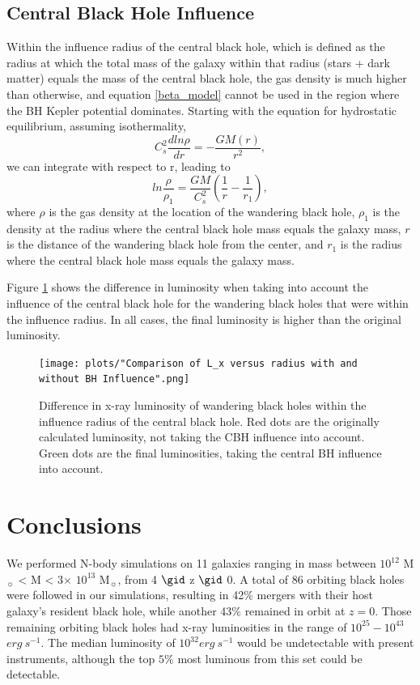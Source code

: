 \documentclass[fleqn,usenatbib,useAMS]{mnras}
\begin{document}
\subsection{Central Black Hole Influence}
Within the influence radius of the central black hole, which is defined as the radius at which the total mass of the galaxy within that radius (stars + dark matter) equals the mass of the central black hole, the gas density is much higher than otherwise, and equation \eqref{beta_model} cannot be used in the region where the BH Kepler potential dominates.  Starting with the equation for hydrostatic equilibrium, assuming isothermality,
\begin{equation}
    C_{s}^2\frac{dln\rho}{dr}= -\frac{GM(r)}{r^2},
\end{equation}
we can integrate with respect to r, leading to 
\begin{equation}
    ln\frac{\rho}{\rho_1} = \frac{GM}{C_{s}^2}\left(\frac{1}{r} - \frac{1}{r_1}\right),
\end{equation}
where $\rho$ is the gas density at the location of the wandering black hole, $\rho_1$ is the density at the radius where the central black hole mass equals the galaxy mass, $r$ is the distance of the wandering black hole from the center, and $r_1$ is the radius where the central black hole mass equals the galaxy mass.

Figure \ref{fig:wui} shows the difference in luminosity when taking into account the influence of the central black hole for the wandering black holes that were within the influence radius.  In all cases, the final luminosity is higher than the original luminosity.
\begin{figure}
\begin{center}
\texttt{[image: plots/"Comparison of L\_x versus radius with and without BH Influence".png]}
\caption{Difference in x-ray luminosity of wandering black holes within the influence radius of the central black hole.  Red dots are the originally calculated luminosity, not taking the CBH influence into account.  Green dots are the final luminosities, taking the central BH influence into account.}
\label{fig:wui}
\end{center}
\end{figure}

\section{Conclusions}\label{sec:conclusions}
We performed N-body simulations on 11 galaxies ranging in mass between $10^{12}$ M$_{\sun}$ < M < 3$\times$ $10^{13}$ M$_{\sun}$, from 4 $\gid$ z $\gid$ 0.  A total of 86 orbiting black holes were followed in our simulations, resulting in 42$\%$ mergers with their host galaxy's resident black hole, while another 43$\%$ remained in orbit at $z=0$.  Those remaining orbiting black holes had x-ray luminosities in the range of $10^{25}-10^{43}$ $erg\ s^{-1}$.  The median luminosity of $10^{32} erg\ s^{-1}$ would be undetectable with present instruments, although the top $5\%$ most luminous from this set could be detectable.
\end{document}
